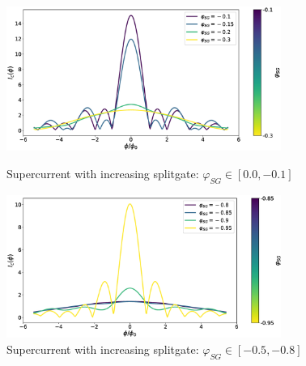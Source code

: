 \documentclass[a4paper]{article}
\begin{document}
\begin{figure}[h!]
\centering
\includegraphics[width=0.8\textwidth]{wg-00-01}
\caption{Supercurrent with increasing splitgate: $\varphi_{SG} \in [0.0, -0.1]$}
\includegraphics[width=0.8\textwidth]{wg-085-095}
\caption{Supercurrent with increasing splitgate: $\varphi_{SG} \in [-0.5, -0.8]$}
\end{figure}
\end{document}
